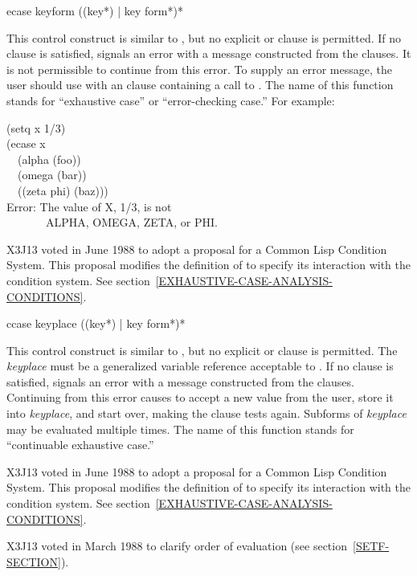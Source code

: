 \begin{defmac}
ecase keyform {({({key}*) | key} {form}*)}*

\begin{obsolete}\noindent
This control construct is similar to ,
but no explicit  or  clause is permitted.
If no clause is satisfied,  signals an error with a
message constructed from the clauses.  It is not permissible to continue
from this error.  To supply an error message, the user should use
 with an  clause containing a call to .
The name of this function stands for ``exhaustive case'' or
``error-checking case.'' 
For example:
\begin{lisp}
(setq x 1/3)	 \\
(ecase x \\
~~(alpha (foo)) \\
~~(omega (bar)) \\
~~((zeta phi) (baz))) \\
Error: The value of X, 1/3, is not \\
~~~~~~~ALPHA, OMEGA, ZETA, or PHI.
\end{lisp}
\end{obsolete}

\begin{new}
X3J13 voted in June 1988
to adopt a proposal for a Common Lisp Condition System. 
This proposal modifies the definition of  to specify its
interaction with the condition system.
See section~\ref{EXHAUSTIVE-CASE-ANALYSIS-CONDITIONS}.
\end{new}
\end{defmac}

\begin{defmac}
ccase keyplace {({({key}*) | key} {form}*)}*

\begin{obsolete}\noindent
This control construct is similar to ,
but no explicit  or  clause is permitted.
The \emph{keyplace} must be a generalized variable reference
acceptable to .  If no clause is satisfied,  signals an error
with a message constructed from the clauses.  Continuing from this error
causes  to accept a new value from the user, store it into
\emph{keyplace}, and start over, making the clause tests again.  Subforms of
\emph{keyplace} may be evaluated multiple times.  The name of this function
stands for ``continuable exhaustive case.''
\end{obsolete}

\begin{new}
X3J13 voted in June 1988
to adopt a proposal for a Common Lisp Condition System. 
This proposal modifies the definition of  to specify its
interaction with the condition system.
See section~\ref{EXHAUSTIVE-CASE-ANALYSIS-CONDITIONS}.
\end{new}

\begin{newer}
X3J13 voted in March 1988 
to clarify order of evaluation (see section~\ref{SETF-SECTION}).
\end{newer}
\end{defmac}

